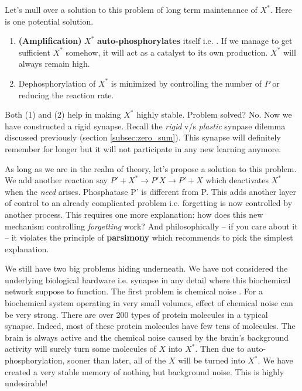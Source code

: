 \documentclass[]{resonance}
\begin{document}
Let's mull over a solution to this problem of long term maintenance of $X^*$.
Here is one potential solution.

\begin{enumerate}
    \item \textbf{(Amplification)} $X^*$ \textbf{auto-phosphorylates} itself i.e. . If we manage to get sufficient $X^*$ somehow, it
        will act as a catalyst to its own production. $X^*$ will always remain
        high.
    \item Dephosphorylation of $X^*$ is minimized by controlling the number of
        $P$ or reducing the reaction rate.
\end{enumerate} 

Both (1) and (2) help in making $X^*$ highly stable. Problem solved? No.  Now
we have constructed a rigid synapse. Recall the \textit{rigid} v/s
\textit{plastic} synpase dilemma discussed previously (section
\ref{subsec:zero_sum}). This synapse will definitely remember for longer
but it will not participate in any new learning anymore.

As long as we are in the realm of theory, let's propose a solution to this
problem. We add another reaction say $P'+X^*\rightarrow P'X \rightarrow P'+X$
which deactivates $X^*$ when the \textit{need} arises. Phosphatase P' is
different from P. This adds another layer of control to an already complicated
problem i.e.  forgetting is now controlled by another process. This requires one
more explanation: how does this new mechanism controlling \textit{forgetting}
work?  And philosophically -- if you care about it -- it violates the principle
of \textbf{parsimony} which recommends to pick the simplest explanation.

We still have two big problems hiding underneath. We have not considered the
underlying biological hardware i.e. synapse in any detail where this biochemical
network suppose to function. The first problem is chemical noise . For a
biochemical system operating in very small volumes, effect of chemical noise can
be very strong.  There are over 200 types of protein molecules in
a typical synapse. Indeed, most of these protein molecules have few tens of
molecules. The brain is always active and the chemical noise caused by the
brain's background activity will surely turn some molecules of $X$ into $X^*$.
Then due to auto-phosphorylation, sooner than later, all of the $X$ will be
turned into $X^*$. We have created a very stable memory of nothing but
background noise. This is highly undesirable!
\end{document}
